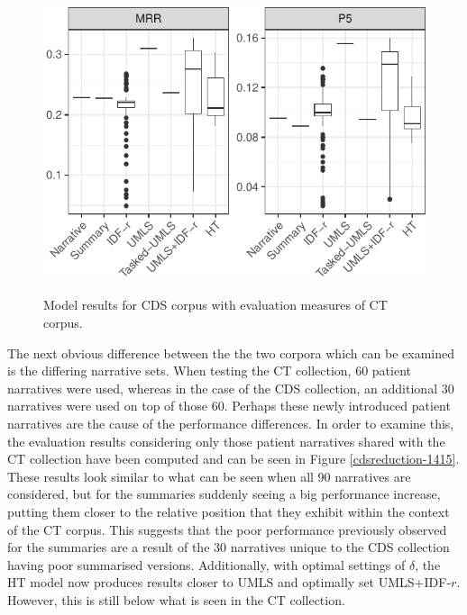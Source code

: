 \documentclass[a4paper]{report}
\begin{document}
\begin{figure}
\centering
\caption{Model results for CDS corpus with evaluation measures of CT corpus.}
\includegraphics[width=.9\columnwidth]{reductioncompar.pdf}
\label{cteval-cds}
\end{figure}

The next obvious difference between the the two corpora which can be examined is the differing narrative sets. When testing the CT collection, 60 patient narratives were used, whereas in the case of the CDS collection, an additional 30 narratives were used on top of those 60. Perhaps these newly introduced patient narratives are the cause of the performance differences. In order to examine this, the evaluation results considering only those patient narratives shared with the CT collection have been computed and can be seen in Figure \ref{cdsreduction-1415}. These results look similar to what can be seen when all 90 narratives are considered, but for the summaries suddenly seeing a big performance increase, putting them closer to the relative position that they exhibit within the context of the CT corpus. This suggests that the poor performance previously observed for the summaries are a result of the 30 narratives unique to the CDS collection having poor summarised versions. Additionally, with optimal settings of $\delta$, the HT model now produces results closer to UMLS and optimally set UMLS+IDF-$r$. However, this is still below what is seen in the CT collection.
\end{document}
